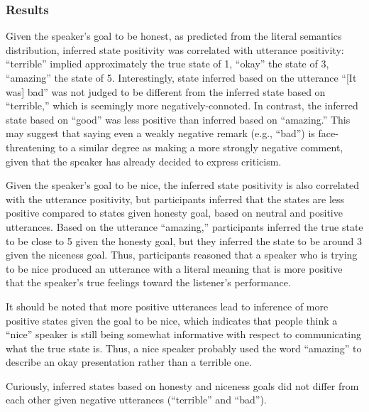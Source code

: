 \documentclass[10pt,letterpaper]{article}
\begin{document}
\subsubsection{Results}

Given the speaker's goal to be honest, as predicted from the literal semantics distribution, inferred state positivity was correlated with utterance positivity: ``terrible'' implied approximately the true state of 1, ``okay'' the state of 3, ``amazing'' the state of 5. Interestingly, state inferred based on the utterance ``[It was] bad'' was not judged to be different from the inferred state based on ``terrible,'' which is seemingly more negatively-connoted. In contrast, the inferred state based on ``good'' was less positive than inferred based on ``amazing.'' This may suggest that saying even a weakly negative remark (e.g., ``bad'') is face-threatening to a similar degree as making a more strongly negative comment, given that the speaker has already decided to express criticism.

Given the speaker's goal to be nice, the inferred state positivity is also correlated with the utterance positivity, but participants inferred that the states are less positive compared to states given honesty goal, based on neutral and positive utterances. Based on the utterance ``amazing,'' participants inferred the true state to be close to 5 given the honesty goal, but they inferred the state to be around 3 given the niceness goal. Thus, participants reasoned that a speaker who is trying to be nice produced an utterance  with a literal meaning that is more positive that the speaker's true feelings toward the listener's performance.

It should be noted that more positive utterances lead to inference of more positive states given the goal to be nice, which indicates that people think a ``nice'' speaker is still being somewhat informative with respect to communicating what the true state is. Thus, a nice speaker probably used the word ``amazing'' to describe an okay presentation rather than a terrible one.

Curiously, inferred states based on honesty and niceness goals did not differ from each other given negative utterances (``terrible'' and ``bad''). %
\end{document}
